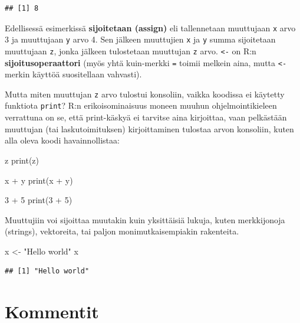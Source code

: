 \documentclass[
]{book}
\newenvironment{Shaded}{\begin{snugshade}}{\end{snugshade}}
\newcommand{\DecValTok}[1]{\textcolor[rgb]{0.00,0.00,0.81}{#1}}
\newcommand{\FunctionTok}[1]{\textcolor[rgb]{0.00,0.00,0.00}{#1}}
\newcommand{\NormalTok}[1]{#1}
\newcommand{\OtherTok}[1]{\textcolor[rgb]{0.56,0.35,0.01}{#1}}
\newcommand{\SpecialCharTok}[1]{\textcolor[rgb]{0.00,0.00,0.00}{#1}}
\newcommand{\StringTok}[1]{\textcolor[rgb]{0.31,0.60,0.02}{#1}}
\begin{document}
\begin{verbatim}
## [1] 8
\end{verbatim}

Edellisessä esimerkissä \textbf{sijoitetaan (assign)} eli tallennetaan muuttujaan \texttt{x} arvo 3 ja muuttujaan \texttt{y} arvo 4. Sen jälkeen muuttujien \texttt{x} ja \texttt{y} summa sijoitetaan muuttujaan \texttt{z}, jonka jälkeen tulostetaan muuttujan \texttt{z} arvo. \texttt{\textless{}-} on R:n \textbf{sijoitusoperaattori} (myös yhtä kuin-merkki \texttt{=} toimii melkein aina, mutta \texttt{\textless{}-} merkin käyttöä suositellaan vahvasti).

Mutta miten muuttujan \texttt{z} arvo tulostui konsoliin, vaikka koodissa ei käytetty funktiota \texttt{print}? R:n erikoisominaisuus moneen muuhun ohjelmointikieleen verrattuna on se, että print-käskyä ei tarvitse aina kirjoittaa, vaan pelkästään muuttujan (tai laskutoimituksen) kirjoittaminen tulostaa arvon konsoliin, kuten alla oleva koodi havainnollistaa:

\begin{Shaded}
\begin{Highlighting}[]
\NormalTok{z}
\FunctionTok{print}\NormalTok{(z)}

\NormalTok{x }\SpecialCharTok{+}\NormalTok{ y}
\FunctionTok{print}\NormalTok{(x }\SpecialCharTok{+}\NormalTok{ y)}

\DecValTok{3} \SpecialCharTok{+} \DecValTok{5}
\FunctionTok{print}\NormalTok{(}\DecValTok{3} \SpecialCharTok{+} \DecValTok{5}\NormalTok{)}
\end{Highlighting}
\end{Shaded}

Muuttujiin voi sijoittaa muutakin kuin yksittäisiä lukuja, kuten merkkijonoja (strings), vektoreita, tai paljon monimutkaisempiakin rakenteita.

\begin{Shaded}
\begin{Highlighting}[]
\NormalTok{x }\OtherTok{\textless{}{-}} \StringTok{"Hello world"}
\NormalTok{x}
\end{Highlighting}
\end{Shaded}

\begin{verbatim}
## [1] "Hello world"
\end{verbatim}

\hypertarget{comments}{%
\section{Kommentit}\label{comments}}
\end{document}
